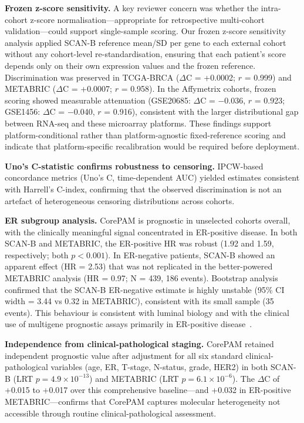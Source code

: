 \documentclass[pdflatex,sn-vancouver-num]{sn-jnl}
\begin{document}
\textbf{Frozen z-score sensitivity.} A key reviewer concern was whether the intra-cohort z-score normalisation---appropriate for retrospective multi-cohort validation---could support single-sample scoring. Our frozen z-score sensitivity analysis applied SCAN-B reference mean/SD per gene to each external cohort without any cohort-level re-standardisation, ensuring that each patient's score depends only on their own expression values and the frozen reference. Discrimination was preserved in TCGA-BRCA ($\Delta$C = +0.0002; $r$ = 0.999) and METABRIC ($\Delta$C = +0.0007; $r$ = 0.958). In the Affymetrix cohorts, frozen scoring showed measurable attenuation (GSE20685: $\Delta$C = $-$0.036, $r$ = 0.923; GSE1456: $\Delta$C = $-$0.040, $r$ = 0.916), consistent with the larger distributional gap between RNA-seq and these microarray platforms. These findings support platform-conditional rather than platform-agnostic fixed-reference scoring and indicate that platform-specific recalibration would be required before deployment.

\textbf{Uno's C-statistic confirms robustness to censoring.} IPCW-based concordance metrics (Uno's C, time-dependent AUC) yielded estimates consistent with Harrell's C-index, confirming that the observed discrimination is not an artefact of heterogeneous censoring distributions across cohorts.

\textbf{ER subgroup analysis.} CorePAM is prognostic in unselected cohorts overall, with the clinically meaningful signal concentrated in ER-positive disease. In both SCAN-B and METABRIC, the ER-positive HR was robust (1.92 and 1.59, respectively; both $p < 0.001$). In ER-negative patients, SCAN-B showed an apparent effect (HR = 2.53) that was not replicated in the better-powered METABRIC analysis (HR = 0.97; N = 439, 186 events). Bootstrap analysis confirmed that the SCAN-B ER-negative estimate is highly unstable (95\% CI width = 3.44 vs 0.32 in METABRIC), consistent with its small sample (35 events). This behaviour is consistent with luminal biology and with the clinical use of multigene prognostic assays primarily in ER-positive disease~\cite{sparano2018,dowsett2013}.

\textbf{Independence from clinical-pathological staging.} CorePAM retained independent prognostic value after adjustment for all six standard clinical-pathological variables (age, ER, T-stage, N-status, grade, HER2) in both SCAN-B (LRT $p = 4.9 \times 10^{-13}$) and METABRIC (LRT $p = 6.1 \times 10^{-6}$). The $\Delta$C of +0.015 to +0.017 over this comprehensive baseline---and +0.032 in ER-positive METABRIC---confirms that CorePAM captures molecular heterogeneity not accessible through routine clinical-pathological assessment.
\end{document}
